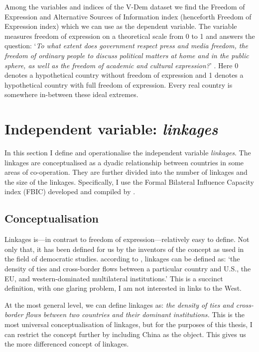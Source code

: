 Among the variables and indices of the V-Dem dataset we find the Freedom of Expression and Alternative Sources of Information index (henceforth Freedom of Expression index) which we can use as the dependent variable. The variable measures freedom of expression on a theoretical scale from 0 to 1 and answers the question: `\textit{To what extent does government respect press and media freedom, the freedom of ordinary people to discuss political matters at home and in the public sphere, as well as the freedom of academic and cultural expression?}' \citep[pp. 50-51]{coppedge_v-dem_2024-1}. Here 0 denotes a hypothetical country without freedom of expression and 1 denotes a hypothetical country with full freedom of expression. Every real country is somewhere in-between these ideal extremes.

\section{Independent variable: \textit{linkages}}
In this section I define and operationalise the independent variable \textit{linkages}. The linkages are conceptualised as a dyadic relationship between countries in some areas of co-operation. They are further divided into the number of linkages and the size of the linkages. Specifically, I use the Formal Bilateral Influence Capacity index (FBIC) developed and compiled by \citet{moyer_china-us_2021}.

\subsection{Conceptualisation}
Linkages is---in contrast to freedom of expression---relatively easy to define. Not only that, it has been defined for us by the inventors of the concept as used in the field of democratic studies. according to \citet[pp. 383-384]{levitsky_linkage_2006}, linkages can be defined as: `the density of ties and cross-border flows between a particular country and U.S., the EU, and western-dominated multilateral institutions.' \citep[p. 383]{levitsky_linkage_2006} This is a succinct definition, with one glaring problem, I am not interested in links to the West. 

At the most general level, we can define linkages as: \textit{the density of ties and cross-border flows between two countries and their dominant institutions.} This is the most universal conceptualisation of linkages, but for the purposes of this thesis, I can restrict the concept further by including China as the object. This gives us the more differenced concept of linkages.


